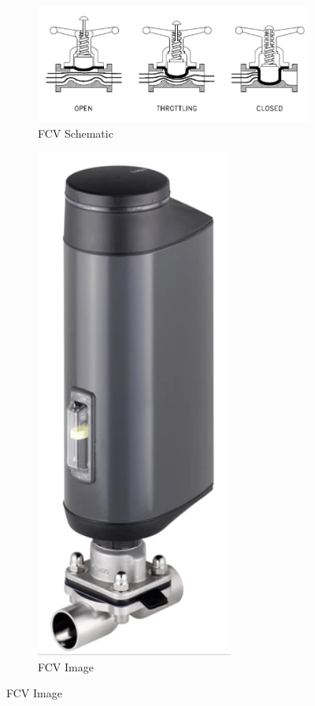 \begin{figure}[H]
    \centering
    \begin{subfigure}{0.49\linewidth}
        \includegraphics[width=\linewidth]{chapters/Z-support/figures/fcv_diagram.PNG}
        \caption{FCV Schematic \cite{noauthor_type_nodate}}
    \end{subfigure}
    \begin{subfigure}{0.49\linewidth}
        \includegraphics[width=0.49\linewidth]{chapters/Z-support/figures/fcv.PNG}
        \caption{FCV Image \cite{noauthor_diaphragm_nodate}}
    \end{subfigure}
\end{figure}

